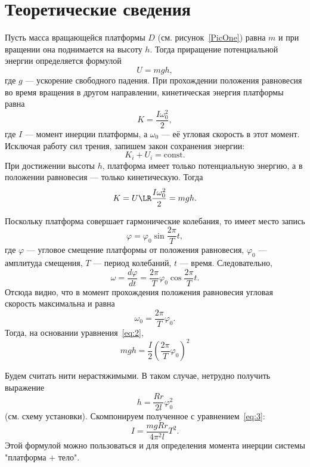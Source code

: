 \section{Теоретические сведения}

Пусть масса вращающейся платформы $D$ (см. рисунок~\ref{PicOne}) равна $m$ и при вращении она поднимается на высоту $h$. Тогда приращение потенциальной энергии определяется формулой
\[
U=mgh,
\]
где $g$ --- ускорение свободного падения. При прохождении положения равновесия во время вращения в другом направлении, кинетическая энергия платформы равна
\[
K=\frac{I\omega_0^2}{2},
\]
где $I$ --- момент инерции платформы, а $\omega_0$ --- её угловая скорость в этот момент. Исключая работу сил трения, запишем закон сохранения энергии:
\begin{equation}\label{eq:1}
K_i+U_i=\text{const}.
\end{equation}
При достижении высоты $h$, платформа имеет только потенциальную энергию, а в положении равновесия --- только кинетическую. Тогда
\begin{equation}\label{eq:2}
K=U\LR\frac{I\omega_0^2}{2}=mgh.
\end{equation}

Поскольку платформа совершает гармонические колебания, то имеет место запись
\[
\varphi=\varphi_0\sin\frac{2\pi}{T}t,
\]
где $\varphi$ --- угловое смещение платформы от положения равновесия, $\varphi_0$ --- амплитуда смещения, $T$ --- период колебаний, $t$ --- время. Следовательно,
\[
\omega=\frac{d\varphi}{dt}=\frac{2\pi}{T}\varphi_0\cos\frac{2\pi}{T}t.
\]
Отсюда видно, что в момент прохождения положения равновесия угловая скорость максимальна и равна
\[
\omega_0=\frac{2\pi}{T}\varphi_0.
\]
Тогда, на основании уравнения~\eqref{eq:2},
\begin{equation}\label{eq:3}
mgh=\frac{I}{2}\left(\frac{2\pi}{T}\varphi_0\right)^2
\end{equation}

Будем считать нити нерастяжимыми. В таком случае, нетрудно получить выражение
\[
h=\frac{Rr}{2l}\varphi_0^2
\]
(см. схему установки).
Скомпонируем полученное с уравнением~\eqref{eq:3}:
\begin{equation}\label{eq:4}
I=\frac{mgRr}{4\pi^2l}T^2.
\end{equation}
Этой формулой можно пользоваться и для определения момента инерции системы "платформа $+$ тело"{}.
